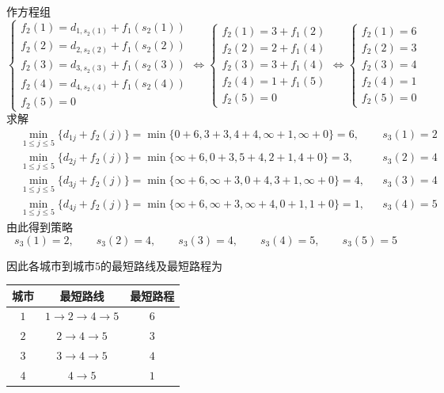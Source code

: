 \documentclass[lang = cn, scheme = chinese, thmcnt = section]{elegantbook}
\begin{document}
\begin{solution}
	作方程组
	$$
	\begin{cases}
		f_2(1)=d_{1,s_2(1)}+f_1(s_2(1))\\
		f_2(2)=d_{2,s_2(2)}+f_1(s_2(2))\\
		f_2(3)=d_{3,s_2(3)}+f_1(s_2(3))\\
		f_2(4)=d_{4,s_2(4)}+f_1(s_2(4))\\
		f_2(5)=0
	\end{cases}
	\iff
	\begin{cases}
		f_2(1)=3+f_1(2)\\
		f_2(2)=2+f_1(4)\\
		f_2(3)=3+f_1(4)\\
		f_2(4)=1+f_1(5)\\
		f_2(5)=0
	\end{cases}
	\iff
	\begin{cases}
		f_2(1)=6\\
		f_2(2)=3\\
		f_2(3)=4\\
		f_2(4)=1\\
		f_2(5)=0
	\end{cases}
	$$
	求解
	\begin{align*}
		& \min_{1\le  j \le 5}\{ d_{1j}+f_2(j) \}
		=\min\{ 0+6, 3+3, 4+4, \infty+1, \infty+0 \}
		=6,&&
		s_3(1)=2\\
		& \min_{1\le  j \le 5}\{ d_{2j}+f_2(j) \}
		=\min\{ \infty+6, 0+3, 5+4, 2+1, 4+0 \}
		=3,&&
		s_3(2)=4\\
		& \min_{1\le  j \le 5}\{ d_{3j}+f_2(j) \}
		=\min\{ \infty+6, \infty+3, 0+4, 3+1, \infty+0 \}
		=4,&&
		s_3(3)=4\\
		& \min_{1\le  j \le 5}\{ d_{4j}+f_2(j) \}
		=\min\{ \infty+6, \infty+3, \infty+4, 0+1, 1+0 \}
		=1,&&
		s_3(4)=5
	\end{align*}
	由此得到策略
	$$
	s_3(1)=2,\qquad
	s_3(2)=4,\qquad
	s_3(3)=4,\qquad
	s_3(4)=5,\qquad
	s_3(5)=5
	$$
	
	因此各城市到城市$5$的最短路线及最短路程为
	\begin{table}[H]
		\centering
		\begin{tabular}{ccc}
			\toprule
			\textbf{城市} & \textbf{最短路线} & \textbf{最短路程} \\
			\midrule
			$1$ & $1\to 2\to 4\to 5$ & $6$ \\
			$2$ & $2\to 4 \to 5$ & $3$ \\
			$3$ & $3\to 4\to 5$ & $4$ \\
			$4$ & $4\to 5$ & $1$ \\
			\bottomrule
		\end{tabular}
	\end{table}
\end{solution}
\end{document}

